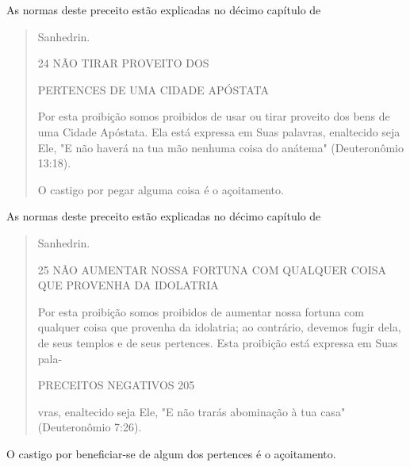 As normas deste preceito estão explicadas no décimo capítulo de

\begin{quote}
Sanhedrin.

24 NÃO TIRAR PROVEITO DOS

PERTENCES DE UMA CIDADE APÓSTATA

Por esta proibição somos proibidos de usar ou tirar proveito dos bens de
uma Cidade Apóstata. Ela está expressa em Suas palavras, enaltecido seja
Ele, "E não haverá na tua mão nenhuma coisa do anátema" (Deuteronômio
13:18).

O castigo por pegar alguma coisa é o açoitamento.
\end{quote}

As normas deste preceito estão explicadas no décimo capítulo de

\begin{quote}
Sanhedrin.

25 NÃO AUMENTAR NOSSA FORTUNA COM QUALQUER COISA QUE PROVENHA DA
IDOLATRIA

Por esta proibição somos proibidos de aumentar nossa fortuna com
qualquer coisa que provenha da idolatria; ao contrário, devemos fugir
dela, de seus templos e de seus pertences. Esta proibição está expressa
em Suas pala-

PRECEITOS NEGATIVOS 205

vras, enaltecido seja Ele, "E não trarás abominação à tua casa"
(Deuteronômio 7:26).
\end{quote}

O castigo por beneficiar-se de algum dos pertences é o açoitamento.

